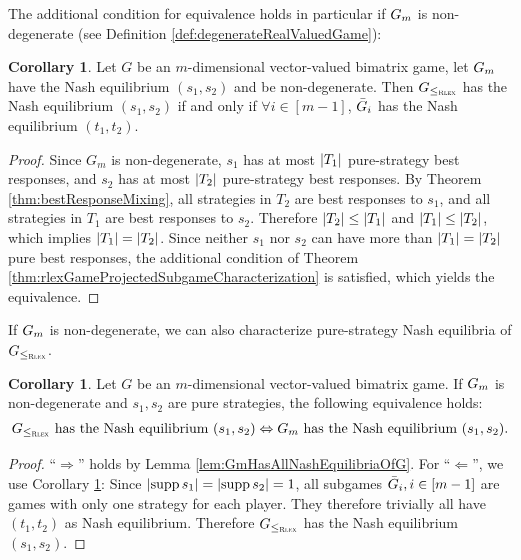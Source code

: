 \documentclass[a4paper,DIV=11]{scrreprt}
\theoremstyle{definition}
\newtheorem{cor}[thm]{Corollary}
\begin{document}
    The additional condition for equivalence holds in particular if $G_{m}$ is non-degenerate (see Definition \ref{def:degenerateRealValuedGame}):
    \begin{cor}        
        \label{cor:degenerateGamesYieldLeqRlexEquivalence}
        Let $G$ be an $m$-dimensional vector-valued bimatrix game, let $G_{m}$ have the Nash equilibrium $(s_1, s_2)$ and be non-degenerate.
        Then $G_{\leq_{\textsc{Rlex}}}$ has the Nash equilibrium $(s_1, s_2)$ if and only if $\forall i \in [m-1]$, $\bar{G}_{i}$ has the Nash equilibrium $(t_1, t_2)$.
    \end{cor}
    \begin{proof}
        Since $G_m$ is non-degenerate, $s_1$ has at most $\left| T_1 \right|$ pure-strategy best responses, and $s_2$ has at most $\left| T_2 \right|$ pure-strategy best responses.
        By Theorem \ref{thm:bestResponseMixing}, all strategies in $T_2$ are best responses to $s_1$, and all strategies in $T_1$ are best responses to $s_2$. Therefore $\left| T_2 \right| \leq \left| T_1 \right|$ and $\left| T_1 \right| \leq \left| T_2 \right|$, which implies $\left| T_1 \right| = \left| T_2 \right|$.
        Since neither $s_1$ nor $s_2$ can have more than $\left| T_1 \right| = \left| T_2 \right|$ pure best responses, the additional condition of Theorem \ref{thm:rlexGameProjectedSubgameCharacterization} is satisfied, which yields the equivalence.
    \end{proof}

    If $G_{m}$ is non-degenerate, we can also characterize pure-strategy Nash equilibria of $G_{\leq_{\textsc{Rlex}}}$.
    \begin{cor}
        \label{cor:degenerateGamesYieldPureEquilibriaGmGEquivalence}
        Let $G$ be an $m$-dimensional vector-valued bimatrix game. If $G_{m}$ is non-degenerate and $s_1, s_2$ are pure strategies, the following equivalence holds:
        \begin{gather*}
            \text{$G_{\leq_{\textsc{Rlex}}}$ has the Nash equilibrium $(s_1, s_2) \Leftrightarrow G_{m}$ has the Nash equilibrium $(s_1, s_2)$.}
        \end{gather*}
    \end{cor}
    \begin{proof}
        “$\Rightarrow$” holds by Lemma \ref{lem:GmHasAllNashEquilibriaOfG}.
        For “$\Leftarrow$”, we use Corollary \ref{cor:degenerateGamesYieldLeqRlexEquivalence}: Since $\left| \operatorname{supp} s_1 \right| = \left| \operatorname{supp} s_2 \right| = 1$, all subgames $\bar{G}_{i}, i \in [m-1]$ are games with only one strategy for each player. They therefore trivially all have $(t_1, t_2)$ as Nash equilibrium.
        Therefore $G_{\leq_{\textsc{Rlex}}}$ has the Nash equilibrium $(s_1, s_2)$.
    \end{proof}
\end{document}
